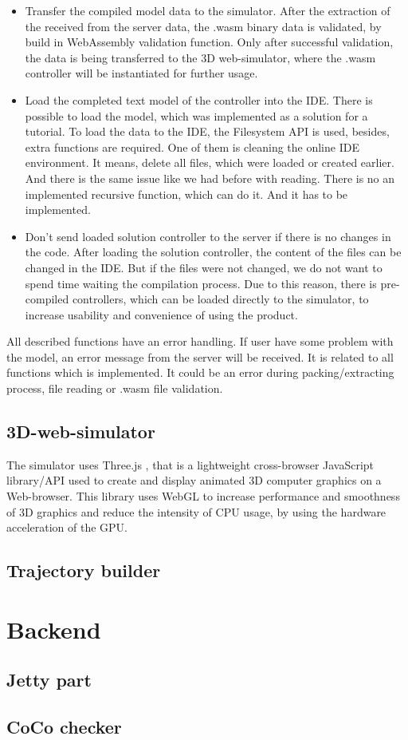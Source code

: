 \begin{itemize}
    \item Transfer the compiled model data to the simulator. After the extraction of the received from the server data, the .wasm binary data is validated, by build in WebAssembly validation function. Only after successful validation, the data is being transferred to the 3D web-simulator, where the .wasm controller will be instantiated for further usage.
    \item Load the completed text model of the controller into the IDE. There is possible to load the model, which was implemented as a solution for a tutorial. To load the data to the IDE, the Filesystem API is used, besides, extra functions are required. One of them is cleaning the online IDE environment. It means, delete all files, which were loaded or created earlier. And there is the same issue like we had before with reading. There is no an implemented recursive function, which can do it. And it has to be implemented.
    \item Don't send loaded solution controller to the server if there is no changes in the code. After loading the solution controller, the content of the files can be changed in the IDE. But if the files were not changed, we do not want to spend time waiting the compilation process. Due to this reason, there is pre-compiled controllers, which can be loaded directly to the simulator, to increase usability and convenience of using the product.
\end{itemize}
All described functions have an error handling. If user have some problem with the model, an error message from the server will be received. It is related to all functions which is implemented. It could be an error during packing/extracting process, file reading or .wasm file validation.
\subsection{3D-web-simulator}
The simulator uses Three.js \cite{ThreeJS}, that is a lightweight cross-browser JavaScript library/API used to create and display animated 3D computer graphics on a Web-browser. This library uses WebGL \cite{WebGL} to increase performance and smoothness of 3D graphics and reduce the intensity of CPU usage, by using the hardware acceleration of the GPU.
\subsection{Trajectory builder}
\section{Backend}
\subsection{Jetty part}
\subsection{CoCo checker}
